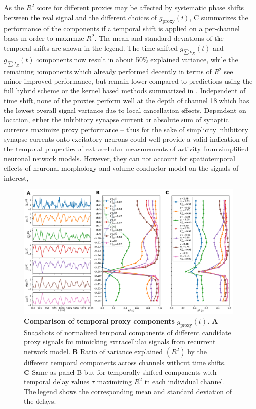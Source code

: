 As the $R^2$ score for different proxies may be affected by systematic phase shifts between the real signal and the different choices of $g_\text{proxy}(t)$, 
C summarizes the performance of the components if a temporal shift is applied on a per-channel  basis in order to maximize $R^2$. 
The mean and standard deviations of the temporal shifts are shown in the legend. 
The time-shifted $g_{\sum \nu_X}(t)$ and $g_{\sum I_E}(t)$ components now result in about 50\% explained variance, 
while the remaining components which already performed decently in terms of $R^2$ see minor improved performance, 
but remain lower compared to predictions using the full hybrid scheme or the kernel based methods summarized in . 
Independent of time shift, none of the proxies perform well at the depth of channel 18 which has the lowest overall signal variance due to local cancellation effects.
Dependent on location, 
either the inhibitory synapse current or absolute sum of synaptic currents maximize proxy performance 
-- thus for the sake of simplicity inhibitory synapse currents onto excitatory neurons could well provide a valid indication of the temporal properties of extracellular measurements of activity from simplified neuronal network models. 
However,  
they can not account for spatiotemporal effects of neuronal morphology and volume conductor model on the signals of interest,


\begin{figure}[!ht]
\begin{center}
\includegraphics[width=\textwidth]{Figures/Ch-LFPy/Ch-LFPy-g_proxy.pdf}
\end{center}
\caption{\textbf{Comparison of temporal proxy components} $g_\text{proxy}(t)$\textbf{.} 
{\bf A} Snapshots of normalized temporal components of different candidate proxy signals for mimicking extracellular signals from recurrent network model. 
{\bf B} Ratio of variance explained $(R^2)$ by the different temporal components across channels without time shifts. 
{\bf C} Same as panel B but for temporally shifted components with temporal delay values $\tau$ maximizing $R^2$ in each individual channel. 
The legend shows the corresponding mean and standard deviation of the delays.
}
\label{fig:g_proxy}
\end{figure}



